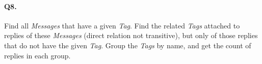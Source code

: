 \paragraph{Q8.}
Find all \emph{Messages} that have a given \emph{Tag}. Find the related
\emph{Tags} attached to replies of these \emph{Messages} (direct
relation not transitive), but only of those replies that do not have the
given \emph{Tag}.
Group the \emph{Tags} by name, and get the count of replies in each
group.
